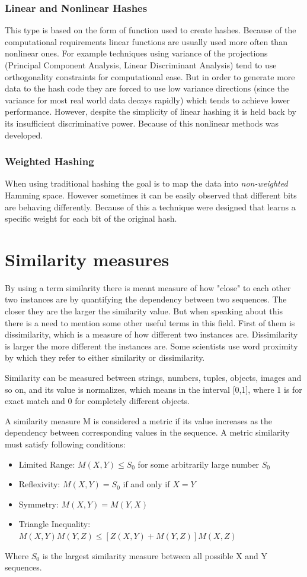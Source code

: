 \subsubsection{Linear and Nonlinear Hashes}
This type is based on the form of function used to create hashes. Because of the computational requirements linear functions are usually used more often than nonlinear ones. For example techniques using variance of the projections (Principal Component Analysis, Linear Discriminant Analysis) tend to use orthogonality constraints for computational ease. But in order to generate more data to the hash code they are forced to use low variance directions (since the variance for most real world data decays rapidly) which tends to achieve lower performance.
However, despite the simplicity of linear hashing it is held back by its insufficient discriminative power. Because of this nonlinear methods was developed.

\subsubsection{Weighted Hashing}
When using traditional hashing the goal is to map the data into \textit{non-weighted} Hamming space. However sometimes it can be easily observed that different bits are behaving differently. Because of this a technique were designed that learns a specific weight for each bit of the original hash.



\section{Similarity measures}
By using a term similarity there is meant measure of how "close" to each other two instances are by quantifying the dependency between two sequences. The closer they are the larger the similarity value. But when speaking about this there is a need to mention some other useful terms in this field. First of them is dissimilarity, which is a measure of how different two instances are. Dissimilarity is larger the more different the instances are. Some scientists use word proximity by which they refer to either similarity or dissimilarity.

Similarity can be measured between strings, numbers, tuples, objects, images and so on, and its value is normalizes, which means in the interval [0,1], where 1 is for exact match and 0 for completely different objects. \cite{simDissim}

A similarity measure M is considered a metric if its value increases as the dependency between corresponding values in the sequence. A metric similarity must satisfy following conditions:
\begin{itemize}
\item Limited Range: $M(X,Y) \leq S_0$ for some arbitrarily large number $S_0$
\item Reflexivity: $M(X,Y) = S_0$ if and only if $X=Y$
\item Symmetry: $M(X,Y)=M(Y,X)$
\item Triangle Inequality: $M(X,Y)M(Y,Z)\leq [Z(X,Y)+M(Y,Z)]M(X,Z)$
\end{itemize}
Where $S_0$ is the largest similarity measure between all possible X and Y sequences.

